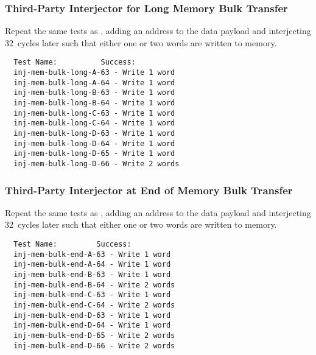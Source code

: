 \subsubsection{Third-Party Interjector for Long Memory Bulk Transfer}
\label{test:inj-mem-bulk-long}

Repeat the same tests as , adding an address to the
\bus data payload and interjecting 32~cycles later such that either one or two
words are written to memory.

\begin{verbatim}
  Test Name:          Success:
  inj-mem-bulk-long-A-63 - Write 1 word
  inj-mem-bulk-long-A-64 - Write 1 word
  inj-mem-bulk-long-B-63 - Write 1 word
  inj-mem-bulk-long-B-64 - Write 1 word
  inj-mem-bulk-long-C-63 - Write 1 word
  inj-mem-bulk-long-C-64 - Write 1 word
  inj-mem-bulk-long-D-63 - Write 1 word
  inj-mem-bulk-long-D-64 - Write 1 word
  inj-mem-bulk-long-D-65 - Write 1 word
  inj-mem-bulk-long-D-66 - Write 2 words
\end{verbatim}

\subsubsection{Third-Party Interjector at End of Memory Bulk Transfer}
\label{test:inj-mem-bulk-end}

Repeat the same tests as , adding an address to the
\bus data payload and interjecting 32~cycles later such that either one or two
words are written to memory.

\begin{verbatim}
  Test Name:         Success:
  inj-mem-bulk-end-A-63 - Write 1 word
  inj-mem-bulk-end-A-64 - Write 1 word
  inj-mem-bulk-end-B-63 - Write 1 word
  inj-mem-bulk-end-B-64 - Write 2 words
  inj-mem-bulk-end-C-63 - Write 1 word
  inj-mem-bulk-end-C-64 - Write 2 words
  inj-mem-bulk-end-D-63 - Write 1 word
  inj-mem-bulk-end-D-64 - Write 1 word
  inj-mem-bulk-end-D-65 - Write 2 words
  inj-mem-bulk-end-D-66 - Write 2 words
\end{verbatim}
